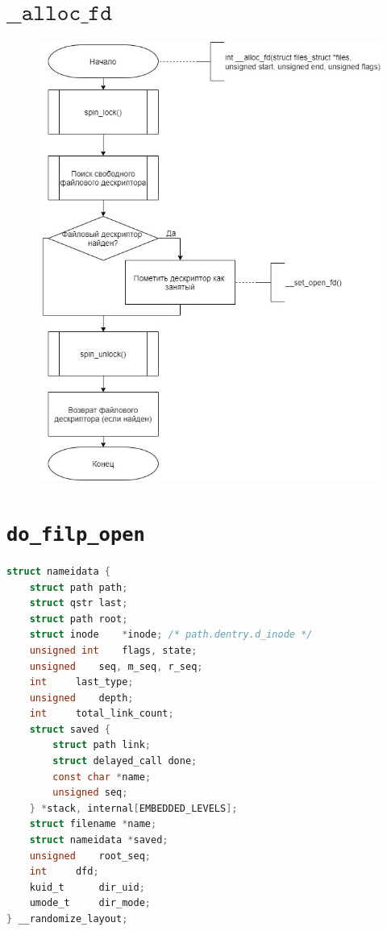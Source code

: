 \documentclass[a4paper,14pt]{extreport}
\begin{document}
\section{$\texttt{\_\_alloc\_fd}$}

\begin{figure}[H]
	\centering
	\includegraphics[scale=0.6]{img/alloc_fd.jpg}
	\label{fig:alloc_fd}
\end{figure}













\section{\texttt{do\_filp\_open}}

\begin{lstlisting}[language=c, caption=Структура nameidata]
struct nameidata {
	struct path	path;
	struct qstr	last;
	struct path	root;
	struct inode	*inode; /* path.dentry.d_inode */
	unsigned int	flags, state;
	unsigned	seq, m_seq, r_seq;
	int		last_type;
	unsigned	depth;
	int		total_link_count;
	struct saved {
		struct path link;
		struct delayed_call done;
		const char *name;
		unsigned seq;
	} *stack, internal[EMBEDDED_LEVELS];
	struct filename	*name;
	struct nameidata *saved;
	unsigned	root_seq;
	int		dfd;
	kuid_t		dir_uid;
	umode_t		dir_mode;
} __randomize_layout;

\end{lstlisting}
\end{document}
